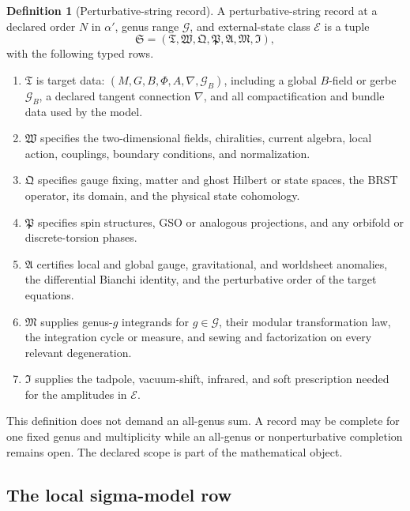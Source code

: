 \documentclass[11pt]{article}
\theoremstyle{definition}
\newtheorem{definition}[theorem]{Definition}
\theoremstyle{remark}
\newcommand{\cE}{\mathcal E}
\newcommand{\cG}{\mathcal G}
\begin{document}
\begin{definition}[Perturbative-string record]
\label{def:string-record}
A perturbative-string record at a declared order \(N\) in \(\alpha'\), genus
range \(\cG\), and external-state class \(\cE\) is a tuple
\[
\mathfrak S=
(\mathfrak T,\mathfrak W,\mathfrak Q,\mathfrak P,
 \mathfrak A,\mathfrak M,\mathfrak I),
\]
with the following typed rows.
\begin{enumerate}[leftmargin=1.7em]
\item \(\mathfrak T\) is target data:
      \((M,G,B,\Phi,A,\nabla,\cG_B)\), including a global \(B\)-field or
      gerbe \(\cG_B\), a declared tangent connection \(\nabla\), and all
      compactification and bundle data used by the model.
\item \(\mathfrak W\) specifies the two-dimensional fields, chiralities,
      current algebra, local action, couplings, boundary conditions, and
      normalization.
\item \(\mathfrak Q\) specifies gauge fixing, matter and ghost Hilbert or
      state spaces, the BRST operator, its domain, and the physical state
      cohomology.
\item \(\mathfrak P\) specifies spin structures, GSO or analogous
      projections, and any orbifold or discrete-torsion phases.
\item \(\mathfrak A\) certifies local and global gauge, gravitational, and
      worldsheet anomalies, the differential Bianchi identity, and the
      perturbative order of the target equations.
\item \(\mathfrak M\) supplies genus-\(g\) integrands for
      \(g\in\cG\), their modular transformation law, the integration cycle or
      measure, and sewing and factorization on every relevant degeneration.
\item \(\mathfrak I\) supplies the tadpole, vacuum-shift, infrared, and soft
      prescription needed for the amplitudes in \(\cE\).
\end{enumerate}
\end{definition}

This definition does not demand an all-genus sum.  A record may be complete
for one fixed genus and multiplicity while an all-genus or nonperturbative
completion remains open.  The declared scope is part of the mathematical
object.

\subsection{The local sigma-model row}
\end{document}
